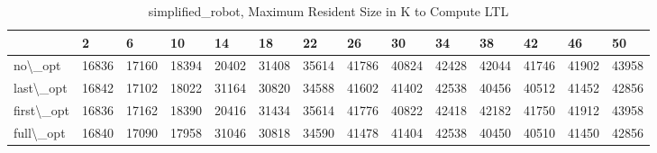 \begin{table}
\centering
\caption{simplified\_robot, Maximum Resident Size in K to Compute LTL}
\label{simplified_robot_LTL_size}
\begin{tabular}{llllllllllllll}
\toprule
{} &      2 &      6 &     10 &     14 &     18 &     22 &     26 &     30 &     34 &     38 &     42 &     46 &     50 \\
\midrule
no\textbackslash \_opt    &  16836 &  17160 &  18394 &  20402 &  31408 &  35614 &  41786 &  40824 &  42428 &  42044 &  41746 &  41902 &  43958 \\
last\textbackslash \_opt  &  16842 &  17102 &  18022 &  31164 &  30820 &  34588 &  41602 &  41402 &  42538 &  40456 &  40512 &  41452 &  42856 \\
first\textbackslash \_opt &  16836 &  17162 &  18390 &  20416 &  31434 &  35614 &  41776 &  40822 &  42418 &  42182 &  41750 &  41912 &  43958 \\
full\textbackslash \_opt  &  16840 &  17090 &  17958 &  31046 &  30818 &  34590 &  41478 &  41404 &  42538 &  40450 &  40510 &  41450 &  42856 \\
\bottomrule
\end{tabular}
\end{table}
